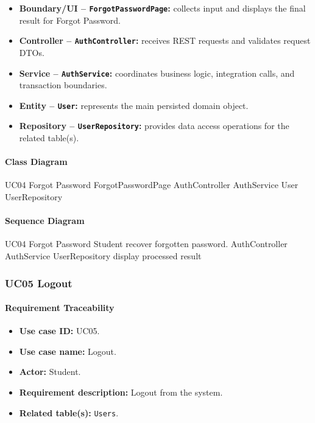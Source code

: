 \begin{itemize}
    \item \textbf{Boundary/UI -- \texttt{ForgotPasswordPage}:} collects input and displays the final result for Forgot Password.
    \item \textbf{Controller -- \texttt{AuthController}:} receives REST requests and validates request DTOs.
    \item \textbf{Service -- \texttt{AuthService}:} coordinates business logic, integration calls, and transaction boundaries.
    \item \textbf{Entity -- \texttt{User}:} represents the main persisted domain object.
    \item \textbf{Repository -- \texttt{UserRepository}:} provides data access operations for the related table(s).
\end{itemize}

\paragraph{Class Diagram}

\ClassDiagram
{UC04 Forgot Password}
{ForgotPasswordPage}
{AuthController}
{AuthService}
{User}
{UserRepository}

\paragraph{Sequence Diagram}

\SequenceDiagram
{UC04 Forgot Password}
{Student}
{recover forgotten password.}
{AuthController}
{AuthService}
{UserRepository}
{display processed result}

\subsubsection{UC05 Logout}

\paragraph{Requirement Traceability}

\begin{itemize}
    \item \textbf{Use case ID:} UC05.
    \item \textbf{Use case name:} Logout.
    \item \textbf{Actor:} Student.
    \item \textbf{Requirement description:} Logout from the system.
    \item \textbf{Related table(s):} \texttt{Users}.
\end{itemize}

